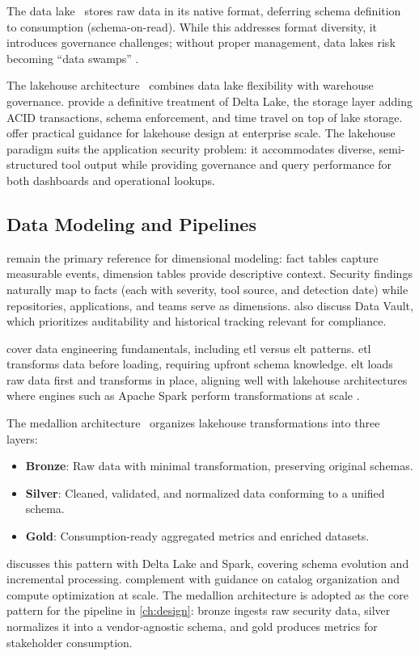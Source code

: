 The data lake~\parencite{Miloslavskaya2016} stores raw data in its native format, deferring schema definition to consumption (schema-on-read). While this addresses format diversity, it introduces governance challenges; without proper management, data lakes risk becoming ``data swamps'' \parencite{DAMA2017}.

The lakehouse architecture~\parencite{Armbrust2021} combines data lake flexibility with warehouse governance. \textcite{Lee2024} provide a definitive treatment of Delta Lake, the storage layer adding ACID transactions, schema enforcement, and time travel on top of lake storage. \textcite{Thalpati2024} offer practical guidance for lakehouse design at enterprise scale. The lakehouse paradigm suits the application security problem: it accommodates diverse, semi-structured tool output while providing governance and query performance for both dashboards and operational lookups.


\subsection{Data Modeling and Pipelines}
\label{sec:data-modeling-pipelines}

\textcite{Kimball2013} remain the primary reference for dimensional modeling: fact tables capture measurable events, dimension tables provide descriptive context. Security findings naturally map to facts (each with severity, tool source, and detection date) while repositories, applications, and teams serve as dimensions. \textcite{DAMA2017} also discuss Data Vault, which prioritizes auditability and historical tracking relevant for compliance.

\textcite{Reis2022} cover data engineering fundamentals, including \gls{etl} versus \gls{elt} patterns. \gls{etl} transforms data before loading, requiring upfront schema knowledge. \gls{elt} loads raw data first and transforms in place, aligning well with lakehouse architectures where engines such as Apache Spark perform transformations at scale \parencite{Lee2024, Thalpati2024}.

The medallion architecture~\parencite{Strengholt2025} organizes lakehouse transformations into three layers:
\begin{itemize}
    \item \textbf{Bronze}: Raw data with minimal transformation, preserving original schemas.
    \item \textbf{Silver}: Cleaned, validated, and normalized data conforming to a unified schema.
    \item \textbf{Gold}: Consumption-ready aggregated metrics and enriched datasets.
\end{itemize}
\textcite{Strengholt2025} discusses this pattern with Delta Lake and Spark, covering schema evolution and incremental processing. \textcite{Thalpati2024} complement with guidance on catalog organization and compute optimization at scale. The medallion architecture is adopted as the core pattern for the pipeline in \autoref{ch:design}: bronze ingests raw security data, silver normalizes it into a vendor-agnostic schema, and gold produces metrics for stakeholder consumption.

